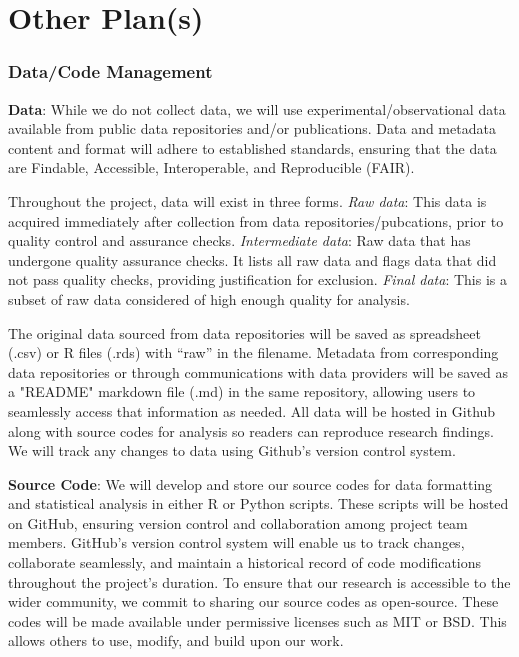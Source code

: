 \documentclass[12pt, class=article, crop=false]{standalone}
\begin{document}
\section*{Other Plan(s)}

\subsubsection*{Data/Code Management}

\textbf{Data}: While we do not collect data, we will use experimental/observational data available from public data repositories and/or publications.
Data and metadata content and format will adhere to established standards, ensuring that the data are Findable, Accessible, Interoperable, and Reproducible (FAIR).

Throughout the project, data will exist in three forms.
\textit{Raw data}: This data is acquired immediately after collection from data repositories/pubcations, prior to quality control and assurance checks.
\textit{Intermediate data}: Raw data that has undergone quality assurance checks.
It lists all raw data and flags data that did not pass quality checks, providing justification for exclusion.
\textit{Final data}: This is a subset of raw data considered of high enough quality for analysis.

The original data sourced from data repositories will be saved as spreadsheet (.csv) or R files (.rds) with ``raw'' in the filename.
Metadata from corresponding data repositories or through communications with data providers will be saved as a "README" markdown file (.md) in the same repository, allowing users to seamlessly access that information as needed.
All data will be hosted in Github along with source codes for analysis so readers can reproduce research findings.
We will track any changes to data using Github's version control system.

\textbf{Source Code}: We will develop and store our source codes for data formatting and statistical analysis in either R or Python scripts.
These scripts will be hosted on GitHub, ensuring version control and collaboration among project team members. 
GitHub's version control system will enable us to track changes, collaborate seamlessly, and maintain a historical record of code modifications throughout the project's duration.
To ensure that our research is accessible to the wider community, we commit to sharing our source codes as open-source. These codes will be made available under permissive licenses such as MIT or BSD. This allows others to use, modify, and build upon our work.
\end{document}
